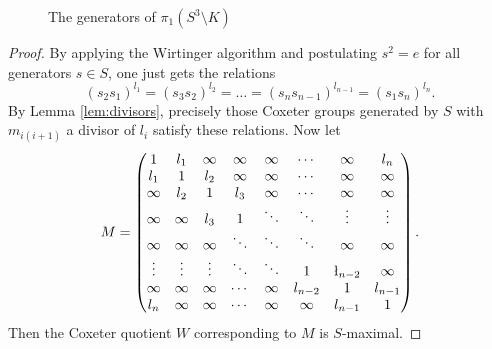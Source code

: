 \documentclass[11pt]{article}
\theoremstyle{definition}
\begin{document}
\begin{figure}
\caption{\label{fig:pretzel-meridians} The generators of $\pi_1(S^3 \setminus K)$}
\end{figure}

\begin{proof}
By applying the Wirtinger algorithm and postulating $s^2 = e$ for all generators $s\in S$, one just gets the relations
$$(s_2s_1)^{l_1} = (s_3s_2)^{l_2} = \dots = (s_ns_{n-1})^{l_{n-1}}= (s_1s_n)^{l_n}.$$
By Lemma \ref{lem:divisors}, precisely those Coxeter groups generated by $S$ with $m_{i(i+1)}$ a divisor of $l_i$ satisfy these relations. Now let
$$M = \left( \begin{matrix}
1 & l_1 & \infty & \infty & \infty &\cdots & \infty & l_n \\
l_1 & 1 & l_2 & \infty & \infty & \cdots & \infty & \infty \\
\infty & l_2 & 1 & l_3 & \infty &\cdots & \infty & \infty \\
\infty & \infty  & l_3 & 1 & \ddots & \ddots & \vdots & \vdots \\
\infty & \infty & \infty & \ddots & \ddots & \ddots & \infty & \infty \\
\vdots & \vdots & \vdots & \ddots &\ddots & 1 & \l_{n-2} & \infty \\
\infty & \infty & \infty & \cdots & \infty & l_{n-2} & 1 & l_{n-1} \\
l_n & \infty & \infty & \cdots & \infty & \infty  & l_{n-1} & 1
\end{matrix} \right).$$
Then the Coxeter quotient $W$ corresponding to $M$ is $S$-maximal.
\end{proof}
\end{document}
